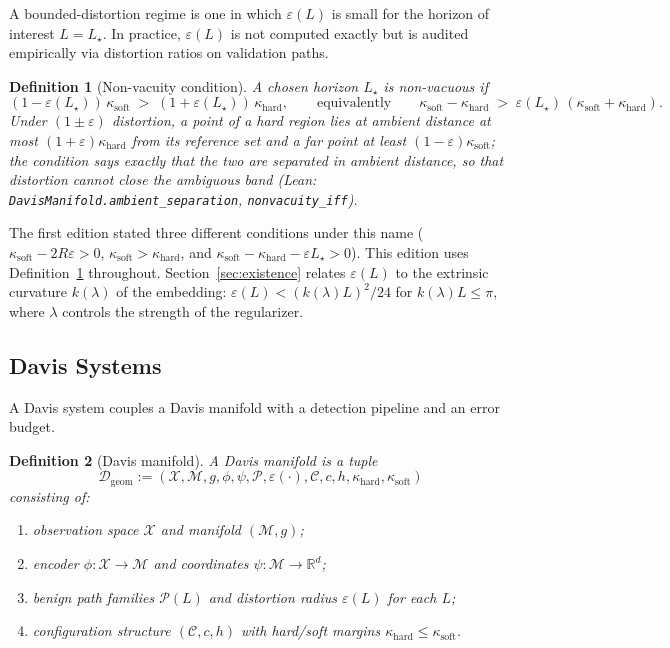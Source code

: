 \documentclass[11pt]{article}
\newtheorem{definition}{Definition}
\theoremstyle{remark}
\theoremstyle{plain}
\begin{document}
A bounded-distortion regime is one in which $\varepsilon(L)$ is small for the horizon
of interest $L=L_\star$. In practice, $\varepsilon(L)$ is not computed exactly but is
audited empirically via distortion ratios on validation paths.

\begin{definition}[Non-vacuity condition]\label{def:nonvacuity}
A chosen horizon $L_\star$ is \emph{non-vacuous} if
\[
    (1-\varepsilon(L_\star))\,\kappa_{\mathrm{soft}} \;>\; (1+\varepsilon(L_\star))\,\kappa_{\mathrm{hard}},
    \qquad\text{equivalently}\qquad
    \kappa_{\mathrm{soft}} - \kappa_{\mathrm{hard}} \;>\; \varepsilon(L_\star)\,(\kappa_{\mathrm{soft}} + \kappa_{\mathrm{hard}}).
\]
Under $(1\pm\varepsilon)$ distortion, a point of a hard region lies at ambient distance at most
$(1+\varepsilon)\kappa_{\mathrm{hard}}$ from its reference set and a far point at least
$(1-\varepsilon)\kappa_{\mathrm{soft}}$; the condition says exactly that the two are separated in ambient
distance, so that distortion cannot close the ambiguous band (Lean: \texttt{DavisManifold.ambient\_separation},
\texttt{nonvacuity\_iff}).
\end{definition}

The first edition stated three different conditions under this name ($\kappa_{\mathrm{soft}} - 2R\varepsilon > 0$,
$\kappa_{\mathrm{soft}} > \kappa_{\mathrm{hard}}$, and $\kappa_{\mathrm{soft}} - \kappa_{\mathrm{hard}} - \varepsilon L_\star > 0$).
This edition uses Definition~\ref{def:nonvacuity} throughout. Section~\ref{sec:existence} relates
$\varepsilon(L)$ to the extrinsic curvature $k(\lambda)$ of the embedding: $\varepsilon(L) < (k(\lambda)L)^2/24$
for $k(\lambda)L \le \pi$, where $\lambda$ controls the strength of the regularizer.

\subsection{Davis Systems}
\label{subsec:davis-system-def}

A Davis system couples a Davis manifold with a detection pipeline and an error budget.

\begin{definition}[Davis manifold]\label{def:davis-manifold}
A \emph{Davis manifold} is a tuple
\[
    \mathcal{D}_{\text{geom}}
    :=
    (\mathcal{X},\mathcal{M},g,\phi,\psi,\mathcal{P},\varepsilon(\cdot),
      \mathcal{C},c,h,\kappa_{\mathrm{hard}},\kappa_{\mathrm{soft}})
\]
consisting of:
\begin{enumerate}[label=(\roman*),leftmargin=*]
    \item observation space $\mathcal{X}$ and manifold $(\mathcal{M},g)$;
    \item encoder $\phi:\mathcal{X}\to\mathcal{M}$ and coordinates $\psi:\mathcal{M}\to\mathbb{R}^d$;
    \item benign path families $\mathcal{P}(L)$ and distortion radius $\varepsilon(L)$ for each $L$;
    \item configuration structure $(\mathcal{C},c,h)$ with hard/soft margins
    $\kappa_{\mathrm{hard}}\le\kappa_{\mathrm{soft}}$.
\end{enumerate}
\end{definition}
\end{document}
